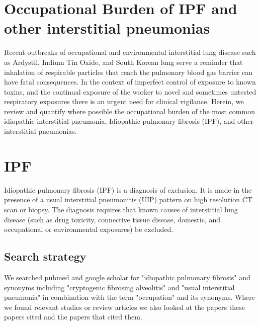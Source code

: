 \documentclass[a4
er,12pt]{article}
\author{Carl Reynolds \\
\small National Heart \& Lung Institute, Imperial College London }
\begin{document}




\section*{\centering Occupational Burden of IPF and other interstitial pneumonias}

Recent outbreaks of occupational and environmental interstitial lung disease such as Ardystil, Indium Tin Oxide, and South Korean lung
serve a reminder that inhalation of respirable particles that reach the pulmonary blood gas barrier can have fatal consequences. In the context of imperfect control of exposure to known toxins, and the continual exposure of the worker to novel and sometimes untested respiratory exposures there is an urgent need for clinical vigilance. Herein, we review and quantify where possible the occupational burden of the most common idiopathic interstitial pneumonia, Idiopathic pulmonary fibrosis (IPF), and other interstitial pneumonias.

\section{IPF}
Idiopathic pulmonary fibrosis (IPF) is a diagnosis of exclusion. It is made in the
presence of a usual interstitial pneumonitis (UIP) pattern on high resolution CT scan
or biopsy. The diagnosis requires that known causes of interstitial lung disease
(such as drug toxicity, connective tissue disease, domestic, and occupational or
environmental exposures) be excluded\cite{Travis2013}.

\subsection{Search strategy}

We searched pubmed and google scholar for "idiopathic pulmonary fibrosis" and synonyms including "cryptogenic fibrosing alveolitis" and "usual interstitial pneumonia" in combination with the term "occupation" and its synonyms. Where we found relevant studies or review articles we also looked at the papers these papers cited and the papers that cited them. 
\end{document}
